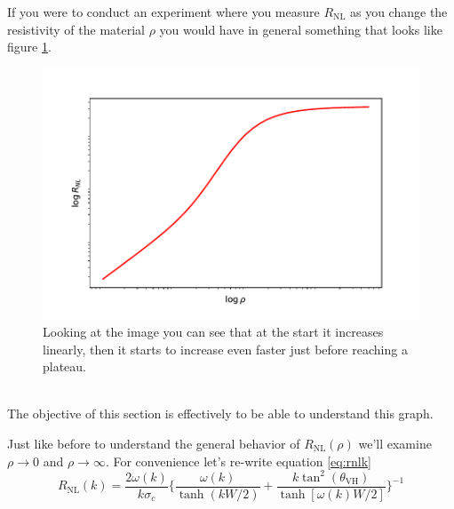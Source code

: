 If you were to conduct an experiment where you measure $R_{\textrm{NL}}$ as you change the resistivity of the material $\rho$ you would have in general something that looks like figure \ref{fig:rho0}.
\begin{figure}[h!]
    \centering
    \includegraphics[width=\linewidth]{Immagini/rnl/rho0.pdf}
    \caption{Looking at the image you can see that at the start it increases linearly, then it starts to increase even faster just before reaching a plateau.}
    \label{fig:rho0}
\end{figure}\\
The objective of this section is effectively to be able to understand this graph.

Just like before to understand the general behavior of $R_{\textrm{NL}}(\rho)$ we'll examine $\rho\to 0$ and $\rho \to \infty$. For convenience let's re-write equation \ref{eq:rnlk}
\[
    R_{\textrm{NL}}(k)=\frac{2\omega(k)}{k\sigma_c}
    \bigg\{
        \frac{\omega(k)}{\tanh(kW/2)} + \frac{k\tan^2(\theta_{\textrm{VH}})}{\tanh[\omega(k)W/2]}    
    \bigg\}^{-1}
\]
















